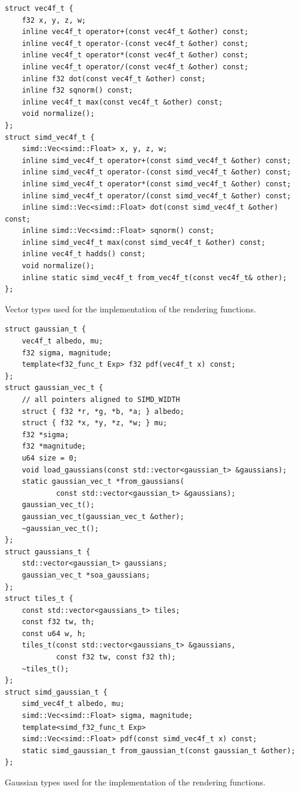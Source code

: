 \documentclass[a4paper, 11pt]{memoir}
\begin{document}
    \begin{listing}[ht]
        \begin{verbatim}
struct vec4f_t {
    f32 x, y, z, w;
    inline vec4f_t operator+(const vec4f_t &other) const;
    inline vec4f_t operator-(const vec4f_t &other) const;
    inline vec4f_t operator*(const vec4f_t &other) const;
    inline vec4f_t operator/(const vec4f_t &other) const;
    inline f32 dot(const vec4f_t &other) const;
    inline f32 sqnorm() const;
    inline vec4f_t max(const vec4f_t &other) const;
    void normalize();
};
struct simd_vec4f_t {
    simd::Vec<simd::Float> x, y, z, w;
    inline simd_vec4f_t operator+(const simd_vec4f_t &other) const;
    inline simd_vec4f_t operator-(const simd_vec4f_t &other) const;
    inline simd_vec4f_t operator*(const simd_vec4f_t &other) const;
    inline simd_vec4f_t operator/(const simd_vec4f_t &other) const;
    inline simd::Vec<simd::Float> dot(const simd_vec4f_t &other) const;
    inline simd::Vec<simd::Float> sqnorm() const;
    inline simd_vec4f_t max(const simd_vec4f_t &other) const;
    inline vec4f_t hadds() const;
    void normalize();
    inline static simd_vec4f_t from_vec4f_t(const vec4f_t& other);
};
        \end{verbatim}
        \caption{Vector types used for the implementation of the rendering functions.}
        \label{lst:vec_types_vrt_full}
    \end{listing}

    \begin{listing}[ht]
        \begin{verbatim}
struct gaussian_t {
    vec4f_t albedo, mu;
    f32 sigma, magnitude;
    template<f32_func_t Exp> f32 pdf(vec4f_t x) const;
};
struct gaussian_vec_t {
    // all pointers aligned to SIMD_WIDTH
    struct { f32 *r, *g, *b, *a; } albedo;
    struct { f32 *x, *y, *z, *w; } mu;
    f32 *sigma;
    f32 *magnitude;
    u64 size = 0;
    void load_gaussians(const std::vector<gaussian_t> &gaussians);
    static gaussian_vec_t *from_gaussians(
            const std::vector<gaussian_t> &gaussians);
    gaussian_vec_t();
    gaussian_vec_t(gaussian_vec_t &other);
    ~gaussian_vec_t();
};
struct gaussians_t {
    std::vector<gaussian_t> gaussians;
    gaussian_vec_t *soa_gaussians;
};
struct tiles_t {
    const std::vector<gaussians_t> tiles;
    const f32 tw, th;
    const u64 w, h;
    tiles_t(const std::vector<gaussians_t> &gaussians,
            const f32 tw, const f32 th);
    ~tiles_t();
};
struct simd_gaussian_t {
    simd_vec4f_t albedo, mu;
    simd::Vec<simd::Float> sigma, magnitude;
    template<simd_f32_func_t Exp>
    simd::Vec<simd::Float> pdf(const simd_vec4f_t x) const;
    static simd_gaussian_t from_gaussian_t(const gaussian_t &other);
};
        \end{verbatim}
        \caption{Gaussian types used for the implementation of the rendering functions.}
        \label{lst:gaussian_types_vrt_full}
    \end{listing}
    
\end{document}
